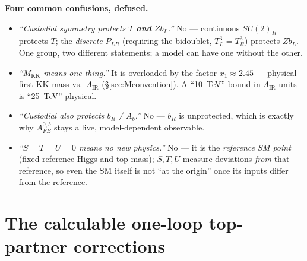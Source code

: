 \documentclass[11pt]{article}
\newenvironment{callout}[1]{%
  \par\medskip\begin{shaded}\noindent\textbf{#1}\par\smallskip}{\end{shaded}\medskip}
\newcommand{\MKK}{M_{\mathrm{KK}}}
\newcommand{\LIR}{\Lambda_{\mathrm{IR}}}
\newcommand{\SUR}{SU(2)_R}
\newcommand{\PLR}{P_{LR}}
\theoremstyle{definition}
\begin{document}
\begin{callout}{Four common confusions, defused.}
\begin{itemize}[leftmargin=1.2em,nosep]
\item[\textbf{A.}] \emph{``Custodial symmetry protects $T$ \textbf{and}
$Zb_L$.''} No --- continuous $\SUR$ protects $T$; the \emph{discrete} $\PLR$
(requiring the bidoublet, $T^3_L=T^3_R$) protects $Zb_L$. One group, two
different statements; a model can have one without the other.
\item[\textbf{B.}] \emph{``$\MKK$ means one thing.''} It is overloaded by the
factor $x_1\approx2.45$ --- physical first KK mass vs.\ $\LIR$
(\S\ref{sec:Mconvention}). A ``10~TeV'' bound in $\LIR$ units is ``25~TeV''
physical.
\item[\textbf{C.}] \emph{``Custodial also protects $b_R$ / $A_b$.''} No --- $b_R$
is unprotected, which is exactly why $A_{FB}^{0,b}$ stays a live, model-dependent
observable.
\item[\textbf{D.}] \emph{``$S=T=U=0$ means no new physics.''} No --- it is the
\emph{reference SM point} (fixed reference Higgs and top mass); $S,T,U$ measure
deviations \emph{from} that reference, so even the SM itself is not ``at the
origin'' once its inputs differ from the reference.
\end{itemize}
\end{callout}

\section{The calculable one-loop top-partner corrections}
\label{sec:loop}
\end{document}
